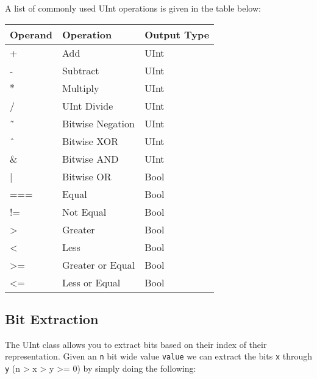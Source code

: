 A list of commonly used UInt operations is given in the table below:

\begin{center}
\begin{tabular}{| l | l | l | }
\hline
Operand & Operation & Output Type \\ \hline
+ & Add & UInt  \\ \hline
- & Subtract & UInt  \\ \hline
$\ast$ & Multiply & UInt \\ \hline
/ & UInt Divide & UInt \\ \hline
\~\ & Bitwise Negation & UInt \\ \hline
\^\ & Bitwise XOR & UInt\\ \hline
\& & Bitwise AND & UInt \\ \hline
 | & Bitwise OR & Bool \\ \hline
=== & Equal & Bool \\ \hline
!= & Not Equal & Bool \\ \hline
> & Greater & Bool \\ \hline
< & Less & Bool \\ \hline
>= & Greater or Equal & Bool \\ \hline
<= & Less or Equal & Bool \\ \hline
\end{tabular}
\end{center}

% 
% 

\subsection{Bit Extraction}

The UInt class allows you to extract bits based on their index of their representation. Given an \verb+n+ bit wide value \verb+value+ we can extract the bits \verb+x+ through \verb+y+ (n > x > y >= 0) by simply doing the following:

